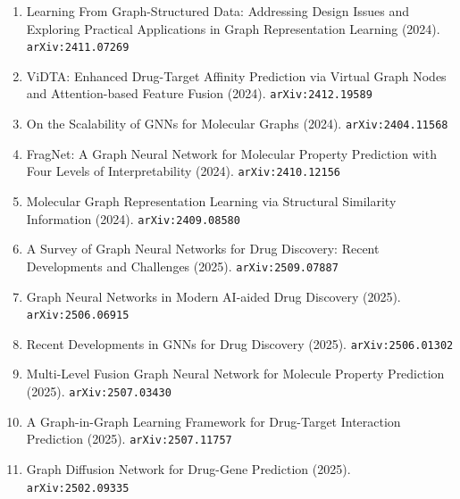 \documentclass[11pt]{article}
\begin{document}
\begin{enumerate}
  \item Learning From Graph-Structured Data: Addressing Design Issues and
  Exploring Practical Applications in Graph Representation Learning (2024). \texttt{arXiv:2411.07269}
  \item ViDTA: Enhanced Drug-Target Affinity Prediction via Virtual Graph Nodes
  and Attention-based Feature Fusion (2024). \texttt{arXiv:2412.19589}
  \item On the Scalability of GNNs for Molecular Graphs (2024). \texttt{arXiv:2404.11568}
  \item FragNet: A Graph Neural Network for Molecular Property Prediction with Four Levels of Interpretability (2024). \texttt{arXiv:2410.12156}
  \item Molecular Graph Representation Learning via Structural Similarity
  Information (2024). \texttt{arXiv:2409.08580}
  \item A Survey of Graph Neural Networks for Drug Discovery: Recent Developments and Challenges (2025). \texttt{arXiv:2509.07887}
  \item Graph Neural Networks in Modern AI-aided Drug Discovery (2025). \texttt{arXiv:2506.06915}
  \item Recent Developments in GNNs for Drug Discovery (2025). \texttt{arXiv:2506.01302}
  \item Multi-Level Fusion Graph Neural Network for Molecule Property Prediction (2025). \texttt{arXiv:2507.03430}
  \item A Graph-in-Graph Learning Framework for Drug-Target Interaction Prediction (2025). \texttt{arXiv:2507.11757}
  \item Graph Diffusion Network for Drug-Gene Prediction (2025). \texttt{arXiv:2502.09335}
\end{enumerate}
\end{document}
